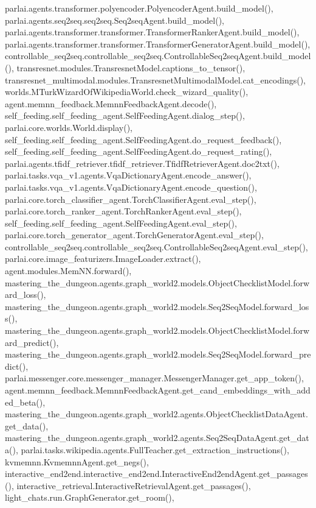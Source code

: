 parlai.\+agents.\+transformer.\+polyencoder.\+Polyencoder\+Agent.\+build\+\_\+model(), parlai.\+agents.\+seq2seq.\+seq2seq.\+Seq2seq\+Agent.\+build\+\_\+model(), parlai.\+agents.\+transformer.\+transformer.\+Transformer\+Ranker\+Agent.\+build\+\_\+model(), parlai.\+agents.\+transformer.\+transformer.\+Transformer\+Generator\+Agent.\+build\+\_\+model(), controllable\+\_\+seq2seq.\+controllable\+\_\+seq2seq.\+Controllable\+Seq2seq\+Agent.\+build\+\_\+model(), transresnet.\+modules.\+Transresnet\+Model.\+captions\+\_\+to\+\_\+tensor(), transresnet\+\_\+multimodal.\+modules.\+Transresnet\+Multimodal\+Model.\+cat\+\_\+encodings(), worlds.\+M\+Turk\+Wizard\+Of\+Wikipedia\+World.\+check\+\_\+wizard\+\_\+quality(), agent.\+memnn\+\_\+feedback.\+Memnn\+Feedback\+Agent.\+decode(), self\+\_\+feeding.\+self\+\_\+feeding\+\_\+agent.\+Self\+Feeding\+Agent.\+dialog\+\_\+step(), parlai.\+core.\+worlds.\+World.\+display(), self\+\_\+feeding.\+self\+\_\+feeding\+\_\+agent.\+Self\+Feeding\+Agent.\+do\+\_\+request\+\_\+feedback(), self\+\_\+feeding.\+self\+\_\+feeding\+\_\+agent.\+Self\+Feeding\+Agent.\+do\+\_\+request\+\_\+rating(), parlai.\+agents.\+tfidf\+\_\+retriever.\+tfidf\+\_\+retriever.\+Tfidf\+Retriever\+Agent.\+doc2txt(), parlai.\+tasks.\+vqa\+\_\+v1.\+agents.\+Vqa\+Dictionary\+Agent.\+encode\+\_\+answer(), parlai.\+tasks.\+vqa\+\_\+v1.\+agents.\+Vqa\+Dictionary\+Agent.\+encode\+\_\+question(), parlai.\+core.\+torch\+\_\+classifier\+\_\+agent.\+Torch\+Classifier\+Agent.\+eval\+\_\+step(), parlai.\+core.\+torch\+\_\+ranker\+\_\+agent.\+Torch\+Ranker\+Agent.\+eval\+\_\+step(), self\+\_\+feeding.\+self\+\_\+feeding\+\_\+agent.\+Self\+Feeding\+Agent.\+eval\+\_\+step(), parlai.\+core.\+torch\+\_\+generator\+\_\+agent.\+Torch\+Generator\+Agent.\+eval\+\_\+step(), controllable\+\_\+seq2seq.\+controllable\+\_\+seq2seq.\+Controllable\+Seq2seq\+Agent.\+eval\+\_\+step(), parlai.\+core.\+image\+\_\+featurizers.\+Image\+Loader.\+extract(), agent.\+modules.\+Mem\+N\+N.\+forward(), mastering\+\_\+the\+\_\+dungeon.\+agents.\+graph\+\_\+world2.\+models.\+Object\+Checklist\+Model.\+forward\+\_\+loss(), mastering\+\_\+the\+\_\+dungeon.\+agents.\+graph\+\_\+world2.\+models.\+Seq2\+Seq\+Model.\+forward\+\_\+loss(), mastering\+\_\+the\+\_\+dungeon.\+agents.\+graph\+\_\+world2.\+models.\+Object\+Checklist\+Model.\+forward\+\_\+predict(), mastering\+\_\+the\+\_\+dungeon.\+agents.\+graph\+\_\+world2.\+models.\+Seq2\+Seq\+Model.\+forward\+\_\+predict(), parlai.\+messenger.\+core.\+messenger\+\_\+manager.\+Messenger\+Manager.\+get\+\_\+app\+\_\+token(), agent.\+memnn\+\_\+feedback.\+Memnn\+Feedback\+Agent.\+get\+\_\+cand\+\_\+embeddings\+\_\+with\+\_\+added\+\_\+beta(), mastering\+\_\+the\+\_\+dungeon.\+agents.\+graph\+\_\+world2.\+agents.\+Object\+Checklist\+Data\+Agent.\+get\+\_\+data(), mastering\+\_\+the\+\_\+dungeon.\+agents.\+graph\+\_\+world2.\+agents.\+Seq2\+Seq\+Data\+Agent.\+get\+\_\+data(), parlai.\+tasks.\+wikipedia.\+agents.\+Full\+Teacher.\+get\+\_\+extraction\+\_\+instructions(), kvmemnn.\+Kvmemnn\+Agent.\+get\+\_\+negs(), interactive\+\_\+end2end.\+interactive\+\_\+end2end.\+Interactive\+End2end\+Agent.\+get\+\_\+passages(), interactive\+\_\+retrieval.\+Interactive\+Retrieval\+Agent.\+get\+\_\+passages(), light\+\_\+chats.\+run.\+Graph\+Generator.\+get\+\_\+room(), 